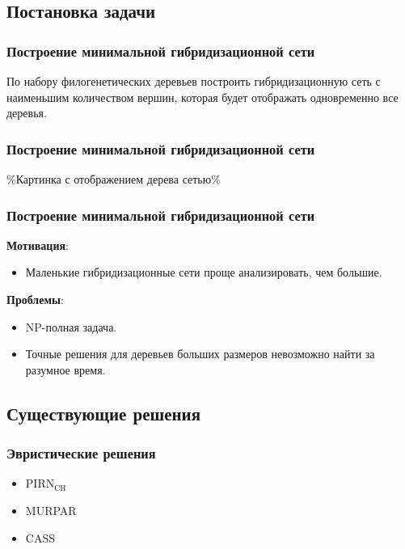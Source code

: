 \documentclass[hyperref={unicode}]{beamer}
\begin{document}
\subsection{Постановка задачи}

\begin{frame}
\frametitle{Построение минимальной гибридизационной сети}

По набору филогенетических деревьев построить гибридизационную сеть с наименьшим количеством вершин, которая будет отображать одновременно все деревья.

\end{frame}

\begin{frame}
\frametitle{Построение минимальной гибридизационной сети}

\%Картинка с отображением дерева сетью\%

\end{frame}

\begin{frame}
\frametitle{Построение минимальной гибридизационной сети}

\textbf{Мотивация}: 
\begin{itemize}
	\item Маленькие гибридизационные сети проще анализировать, чем большие.
\end{itemize}


\textbf{Проблемы}:
\begin{itemize}
	\item NP-полная задача.
	\item Точные решения для деревьев больших размеров невозможно найти за разумное время.
\end{itemize}

\end{frame}

\subsection{Существующие решения}

\begin{frame}
\frametitle{Эвристические решения}

\begin{itemize}
	\item $\mathrm{PIRN_{CH}}$
	\item MURPAR
	\item CASS
\end{itemize}

\end{frame}
\end{document}
